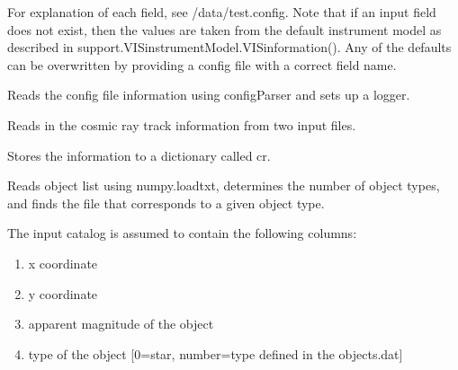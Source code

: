 \documentclass[a4paper,11pt,english]{sphinxmanual}
\begin{document}
\begin{fulllineitems}
\begin{fulllineitems}
For explanation of each field, see /data/test.config. Note that if an input field does not exist,
then the values are taken from the default instrument model as described in
support.VISinstrumentModel.VISinformation(). Any of the defaults can be overwritten by providing
a config file with a correct field name.

\end{fulllineitems}


\begin{fulllineitems}
\label{simulator:simulator.simulator.VISsimulator.readConfigs}
Reads the config file information using configParser and sets up a logger.

\end{fulllineitems}


\begin{fulllineitems}
\label{simulator:simulator.simulator.VISsimulator.readCosmicRayInformation}
Reads in the cosmic ray track information from two input files.

Stores the information to a dictionary called cr.

\end{fulllineitems}


\begin{fulllineitems}
\label{simulator:simulator.simulator.VISsimulator.readObjectlist}
Reads object list using numpy.loadtxt, determines the number of object types,
and finds the file that corresponds to a given object type.

The input catalog is assumed to contain the following columns:
\begin{enumerate}
\item {} 
x coordinate

\item {} 
y coordinate

\item {} 
apparent magnitude of the object

\item {} 
type of the object {[}0=star, number=type defined in the objects.dat{]}


\end{enumerate}
\end{fulllineitems}
\end{fulllineitems}
\end{document}

